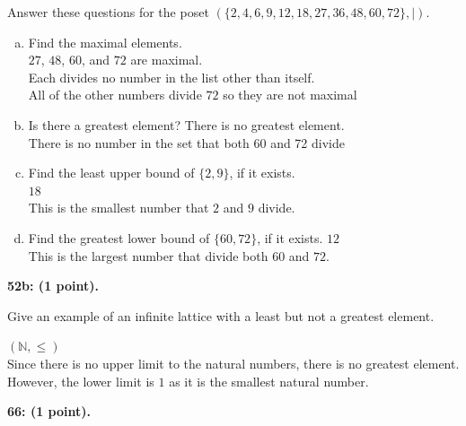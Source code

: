 \documentclass[12pt]{article}  %
\begin{document}
\noindent
Answer these questions for the poset $(\{2,4,6,9,12,18,27,36,48,60,72\},\vert)$.
\begin{enumerate}[a)]
    \item Find the maximal elements.\\
    $27$, $48$, $60$, and $72$ are maximal.\\
    Each divides no number in the list other than itself.\\
    All of the other numbers divide $72$ so they are not maximal
    
    \setcounter{enumi}{2}
    \item Is there a greatest element?
    There is no greatest element.\\
    There is no number in the set that both 60 and 72 divide
    
    \setcounter{enumi}{5}
    \item Find the least upper bound of $\{2,9\}$, if it exists.\\
    $18$\\
    This is the smallest number that $2$ and $9$ divide.
    
    \setcounter{enumi}{7}
    \item Find the greatest lower bound of $\{60,72\}$, if it exists.
    $12$\\
    This is the largest number that divide both $60$ and $72$.
\end{enumerate}

\noindent
{\bf 52b: (1 point).}

\noindent
Give an example of an infinite lattice with a least but not a greatest element.

\noindent
$(\mathbb{N},\leq)$\\
Since there is no upper limit to the natural numbers, there is no greatest element.\\
However, the lower limit is $1$ as it is the smallest natural number.

\clearpage
\noindent
{\bf 66: (1 point).}
\end{document}
